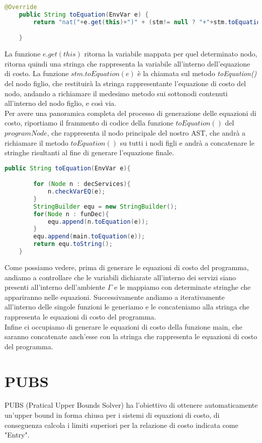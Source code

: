 \documentclass[../../main.tex]{subfiles}
\begin{document}
\begin{lstlisting}[language=Java]
    @Override
    public String toEquation(EnvVar e) {
        return "nat("+e.get(this)+")" + (stm!= null ? "+"+stm.toEquation(e) : "");

    }
\end{lstlisting}

La funzione $e.get(this)$ ritorna la variabile mappata per quel determinato nodo, ritorna quindi una stringa che rappresenta la variabile all'interno dell'equazione di costo. La funzione $stm.toEquation(e)$ è la chiamata sul metodo \textit{toEquation()} del nodo figlio, che restituirà la stringa rappresentante l'equazione di costo del nodo, andando a richiamare il medesimo metodo sui sottonodi contenuti all'interno del nodo figlio, e così via.\\
Per avere una panoramica completa del processo di generazione delle equazioni di costo, riportiamo il frammento di codice della funzione $toEquation()$ del $programNode$, che rappresenta il nodo principale del nostro AST, che andrà a richiamare il metodo $toEquation()$ su tutti i nodi figli e andrà a concatenare le stringhe risultanti al fine di generare l'equazione finale.
\begin{lstlisting}[language=Java, caption={toEquation() del ProgramNode}]
    public String toEquation(EnvVar e){

        for (Node n : decServices){
            n.checkVarEQ(e);
        }
        StringBuilder equ = new StringBuilder();
        for(Node n : funDec){
            equ.append(n.toEquation(e));
        }
        equ.append(main.toEquation(e));
        return equ.toString();
    }
\end{lstlisting}

Come possiamo vedere, prima di generare le equazioni di costo del programma, andiamo a controllare che le variabili dichiarate all'interno dei servizi siano presenti all'interno dell'ambiente $\varGamma$ e le mappiamo con determinate stringhe che appariranno nelle equazioni. Successivamente andiamo a iterativamente all'interno delle singole funzioni le generiamo e le concateniamo alla stringa che rappresenta le equazioni di costo del programma.\\
Infine ci occupiamo di generare le equazioni di costo della funzione main, che saranno concatenate anch'esse con la stringa che rappresenta le equazioni di costo del programma.

\section{PUBS}
\label{sec:pubs}
PUBS (Pratical Upper Bounds Solver) ha l'obiettivo di ottenere automaticamente un'upper bound in forma chiusa per i sistemi di equazioni di costo, di conseguenza calcola i limiti superiori per la relazione di costo indicata come "Entry".
\end{document}

